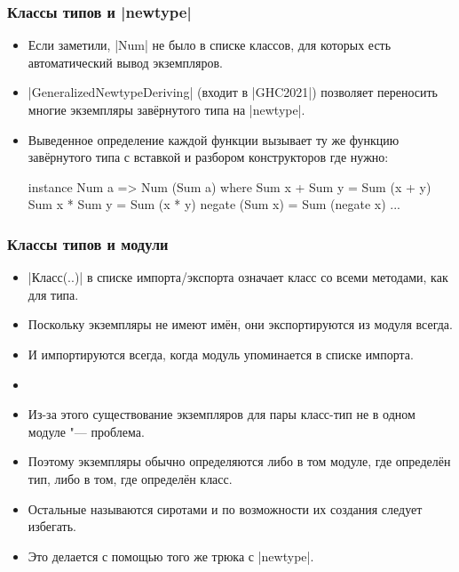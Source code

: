 \documentclass[10pt]{beamer}
\begin{document}
\begin{frame}[fragile]
  \frametitle{Классы типов и \haskinline|newtype|}
  \begin{itemize}
    \item Если заметили, \haskinline|Num| не было в списке классов, для которых есть автоматический вывод экземпляров.
    \item \haskinline|GeneralizedNewtypeDeriving| (входит в \haskinline|GHC2021|) позволяет переносить многие экземпляры завёрнутого типа на \haskinline|newtype|.\pause
    \item Выведенное определение каждой функции вызывает ту же функцию завёрнутого типа с вставкой и разбором конструкторов где нужно:
          \begin{haskell}
            instance Num a => Num (Sum a) where
                Sum x + Sum y = Sum (x + y)
                Sum x * Sum y = Sum (x * y)
                negate (Sum x) = Sum (negate x)
                ...
          \end{haskell}
  \end{itemize}
\end{frame}

\begin{frame}[fragile]
  \frametitle{Классы типов и модули}
  \begin{itemize}
    \item \haskinline|Класс(..)| в списке импорта/экспорта означает класс со всеми методами, как для типа.
    \item Поскольку экземпляры не имеют имён, они экспортируются из модуля всегда.
    \item И импортируются всегда, когда модуль упоминается в списке импорта.\pause
    \item[]
    \item Из-за этого существование экземпляров для пары класс-тип не в одном модуле "--- проблема.
    \item Поэтому экземпляры обычно определяются либо в том модуле, где определён тип, либо в том, где определён класс.
    \item Остальные называются сиротами и по возможности их создания следует избегать.
    \item Это делается с помощью того же трюка с \haskinline|newtype|.
  \end{itemize}
\end{frame}
\end{document}
